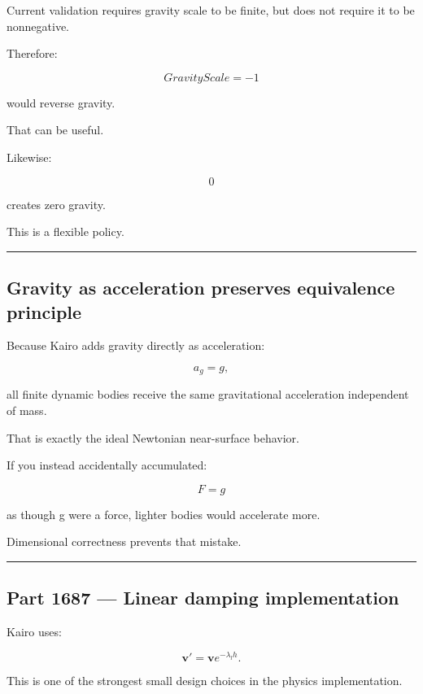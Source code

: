 Current validation requires gravity scale to be finite, but does not require it to be nonnegative.

Therefore:

\[
GravityScale=-1
\]

would reverse gravity.

That can be useful.

Likewise:

\[
0
\]

creates zero gravity.

This is a flexible policy.

\begin{center}\rule{0.5\linewidth}{0.5pt}\end{center}

\subsection{Gravity as acceleration preserves equivalence principle}\label{06-engine-ii-ch038-gravity-as-acceleration-preserves-equivalence-principle}

Because Kairo adds gravity directly as acceleration:

\[
a_g=g,
\]

all finite dynamic bodies receive the same gravitational acceleration independent of mass.

That is exactly the ideal Newtonian near-surface behavior.

If you instead accidentally accumulated:

\[
F=g
\]

as though g were a force, lighter bodies would accelerate more.

Dimensional correctness prevents that mistake.

\begin{center}\rule{0.5\linewidth}{0.5pt}\end{center}

\subsection{Part 1687 --- Linear damping implementation}\label{06-engine-ii-ch038-part-1687-linear-damping-implementation}

Kairo uses:

\[
\boxed{
\mathbf v'
=
\mathbf v
e^{-\lambda_lh}.
}
\]

This is one of the strongest small design choices in the physics implementation.

